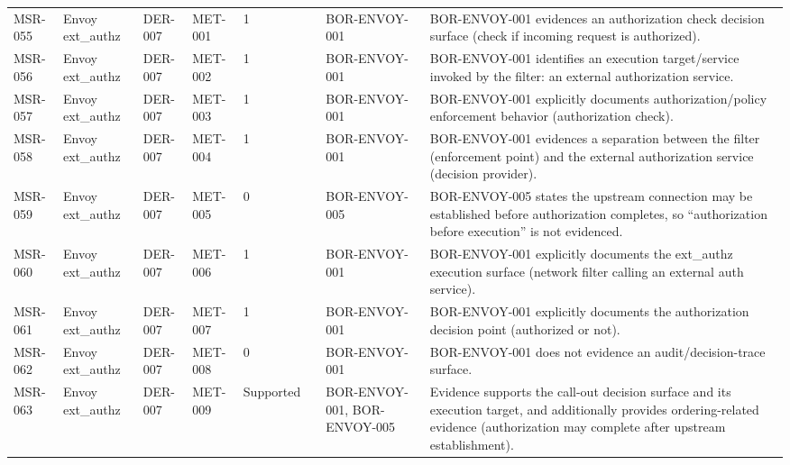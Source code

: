 \documentclass{article}
\begin{document}
\begin{longtable}{@{}p{}p{}p{}p{}p{}p{}p{}p{}@{}}
MSR-055 & Envoy ext\_authz & DER-007 & MET-001 & 1 &  & BOR-ENVOY-001 & BOR-ENVOY-001 evidences an authorization check decision surface (check if incoming request is authorized).\\
MSR-056 & Envoy ext\_authz & DER-007 & MET-002 & 1 &  & BOR-ENVOY-001 & BOR-ENVOY-001 identifies an execution target/service invoked by the filter: an external authorization service.\\
MSR-057 & Envoy ext\_authz & DER-007 & MET-003 & 1 &  & BOR-ENVOY-001 & BOR-ENVOY-001 explicitly documents authorization/policy enforcement behavior (authorization check).\\
MSR-058 & Envoy ext\_authz & DER-007 & MET-004 & 1 &  & BOR-ENVOY-001 & BOR-ENVOY-001 evidences a separation between the filter (enforcement point) and the external authorization service (decision provider).\\
MSR-059 & Envoy ext\_authz & DER-007 & MET-005 & 0 &  & BOR-ENVOY-005 & BOR-ENVOY-005 states the upstream connection may be established before authorization completes, so ``authorization before execution'' is not evidenced.\\
MSR-060 & Envoy ext\_authz & DER-007 & MET-006 & 1 &  & BOR-ENVOY-001 & BOR-ENVOY-001 explicitly documents the ext\_authz execution surface (network filter calling an external auth service).\\
MSR-061 & Envoy ext\_authz & DER-007 & MET-007 & 1 &  & BOR-ENVOY-001 & BOR-ENVOY-001 explicitly documents the authorization decision point (authorized or not).\\
MSR-062 & Envoy ext\_authz & DER-007 & MET-008 & 0 &  & BOR-ENVOY-001 & BOR-ENVOY-001 does not evidence an audit/decision-trace surface.\\
MSR-063 & Envoy ext\_authz & DER-007 & MET-009 & Supported &  & BOR-ENVOY-001, BOR-ENVOY-005 & Evidence supports the call-out decision surface and its execution target, and additionally provides ordering-related evidence (authorization may complete after upstream establishment).\\


\end{longtable}
\end{document}
